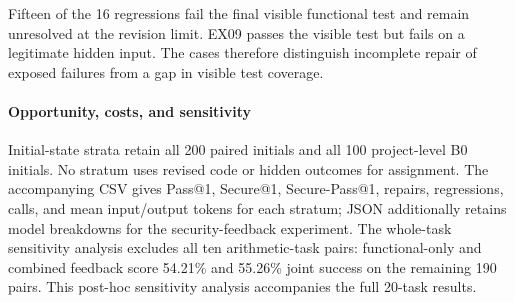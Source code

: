 Fifteen of the 16 regressions fail the final visible functional test and remain unresolved at the revision limit. EX09 passes the visible test but fails on a legitimate hidden input. The cases therefore distinguish incomplete repair of exposed failures from a gap in visible test coverage.

\paragraph{Opportunity, costs, and sensitivity}
Initial-state strata retain all 200 paired initials and all 100 project-level B0 initials. No stratum uses revised code or hidden outcomes for assignment. The accompanying CSV gives Pass@1, Secure@1, Secure-Pass@1, repairs, regressions, calls, and mean input/output tokens for each stratum; JSON additionally retains model breakdowns for the security-feedback experiment. The whole-task sensitivity analysis excludes all ten arithmetic-task pairs: functional-only and combined feedback score 54.21\% and 55.26\% joint success on the remaining 190 pairs. This post-hoc sensitivity analysis accompanies the full 20-task results.
